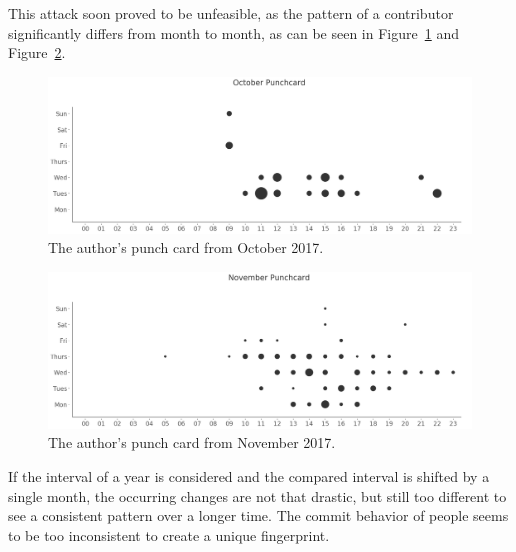 This attack soon proved to be unfeasible, as the pattern of a contributor significantly differs from month to month, as can be seen in Figure~\ref{fig:october-punchcard} and Figure~\ref{fig:november-punchcard}.

\begin{figure}[H]
    \includegraphics[scale=0.32]{./graphs/analysis/october-punchcard}
    \centering
    \caption{The author's punch card from October 2017.}\label{fig:october-punchcard}
\end{figure}

\begin{figure}[H]
    \includegraphics[scale=0.32]{./graphs/analysis/november-punchcard}
    \centering
    \caption{The author's punch card from November 2017.}\label{fig:november-punchcard}
\end{figure}

If the interval of a year is considered and the compared interval is shifted by a single month, the occurring changes are not that drastic, but still too different to see a consistent pattern over a longer time.
The commit behavior of people seems to be too inconsistent to create a unique fingerprint.
